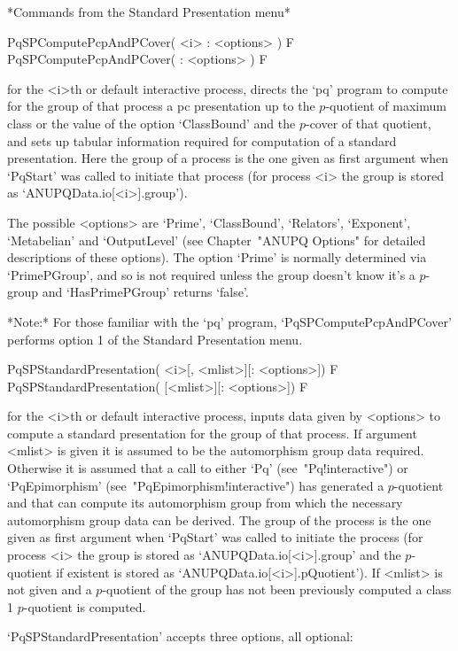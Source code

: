 *Commands from the Standard Presentation menu*

\>PqSPComputePcpAndPCover( <i> : <options> ) F
\>PqSPComputePcpAndPCover( : <options> ) F

for the <i>th or default interactive {\ANUPQ} process, directs  the  `pq'
program to compute for the group of that process a pc presentation  up  to
the $p$-quotient of maximum class or the value of the option `ClassBound'
and the $p$-cover of that  quotient,  and  sets  up  tabular  information
required for computation of a standard presentation. Here the group of  a
process is the one given as first argument when `PqStart' was  called  to
initiate  that  process  (for  process  <i>  the  group  is   stored   as
`ANUPQData.io[<i>].group').

The possible <options> are `Prime', `ClassBound', `Relators', `Exponent',
`Metabelian' and `OutputLevel' (see Chapter~"ANUPQ Options" for  detailed
descriptions of these options). The option `Prime' is normally determined
via `PrimePGroup', and so is not required unless the group  doesn't  know
it's a $p$-group and `HasPrimePGroup' returns `false'.

*Note:*
For  those  familiar  with  the  `pq'  program,  `PqSPComputePcpAndPCover'
performs option 1 of the Standard Presentation menu.

\>PqSPStandardPresentation( <i>[, <mlist>][: <options>]) F
\>PqSPStandardPresentation( [<mlist>][: <options>]) F

for the <i>th or default interactive {\ANUPQ} process, inputs data  given
by <options> to compute a standard presentation for  the  group  of  that
process.  If  argument  <mlist>  is  given  it  is  assumed  to  be   the
automorphism group data required. Otherwise it is assumed that a call  to
either      `Pq'      (see~"Pq!interactive")      or      `PqEpimorphism'
(see~"PqEpimorphism!interactive") has generated a $p$-quotient  and  that
{\GAP} can compute  its  automorphism  group  from  which  the  necessary
automorphism group data can be derived. The group of the process  is  the
one given as first argument when `PqStart' was  called  to  initiate  the
process (for process <i> the group is stored as `ANUPQData.io[<i>].group'
and     the     $p$-quotient     if     existent     is     stored     as
`ANUPQData.io[<i>].pQuotient').  If  <mlist>   is   not   given   and   a
$p$-quotient of the group has not been  previously  computed  a  class  1
$p$-quotient is computed.

`PqSPStandardPresentation' accepts three options, all optional:

